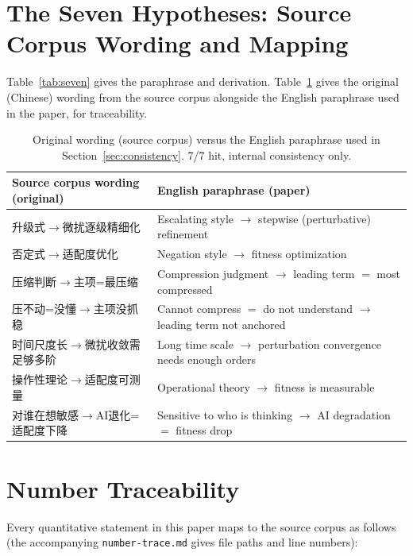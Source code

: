 \appendix
\section{The Seven Hypotheses: Source Corpus Wording and Mapping}
\label{app:hypotheses}

Table~\ref{tab:seven} gives the paraphrase and derivation. Table~\ref{tab:seven_raw}
gives the original (Chinese) wording from the source corpus alongside the
English paraphrase used in the paper, for traceability.

\begin{table}[htbp]
\centering
\small
\begin{tabular}{p{5.4cm}p{5.4cm}}
\toprule
Source corpus wording (original) & English paraphrase (paper) \\
\midrule
升级式$\to$微扰逐级精细化 & Escalating style $\to$ stepwise (perturbative) refinement \\
否定式$\to$适配度优化 & Negation style $\to$ fitness optimization \\
压缩判断$\to$主项=最压缩 & Compression judgment $\to$ leading term $=$ most compressed \\
压不动=没懂$\to$主项没抓稳 & Cannot compress $=$ do not understand $\to$ leading term not anchored \\
时间尺度长$\to$微扰收敛需足够多阶 & Long time scale $\to$ perturbation convergence needs enough orders \\
操作性理论$\to$适配度可测量 & Operational theory $\to$ fitness is measurable \\
对谁在想敏感$\to$AI退化=适配度下降 & Sensitive to who is thinking $\to$ AI degradation $=$ fitness drop \\
\bottomrule
\end{tabular}
\caption{Original wording (source corpus) versus the English paraphrase used in
Section~\ref{sec:consistency}. 7/7 hit, internal consistency only.}
\label{tab:seven_raw}
\end{table}

\section{Number Traceability}
\label{app:trace}

Every quantitative statement in this paper maps to the source corpus as follows
(the accompanying \texttt{number-trace.md} gives file paths and line numbers):

